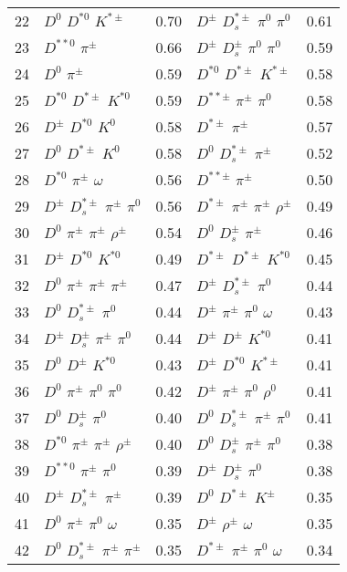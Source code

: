 \documentclass[6pt]{article}
\begin{document}
\begin{tabular}{rlr|lr}
22 & $D^0$ $D^{*0}$ $K^{*\pm}$ & 0.70 & $D^{\pm}$ $D_s^{*\pm}$ $\pi^0$ $\pi^0$ & 0.61 \\
23 & $D^{**0}$ $\pi^{\pm}$ & 0.66 & $D^{\pm}$ $D_s^{\pm}$ $\pi^0$ $\pi^0$ & 0.59 \\
24 & $D^0$ $\pi^{\pm}$ & 0.59 & $D^{*0}$ $D^{*\pm}$ $K^{*\pm}$ & 0.58 \\
25 & $D^{*0}$ $D^{*\pm}$ $K^{*0}$ & 0.59 & $D^{**\pm}$ $\pi^{\pm}$ $\pi^0$ & 0.58 \\
26 & $D^{\pm}$ $D^{*0}$ $K^0$ & 0.58 & $D^{*\pm}$ $\pi^{\pm}$ & 0.57 \\
27 & $D^0$ $D^{*\pm}$ $K^0$ & 0.58 & $D^0$ $D_s^{*\pm}$ $\pi^{\pm}$ & 0.52 \\
28 & $D^{*0}$ $\pi^{\pm}$ $\omega$ & 0.56 & $D^{**\pm}$ $\pi^{\pm}$ & 0.50 \\
29 & $D^{\pm}$ $D_s^{*\pm}$ $\pi^{\pm}$ $\pi^0$ & 0.56 & $D^{*\pm}$ $\pi^{\pm}$ $\pi^{\pm}$ $\rho^{\pm}$ & 0.49 \\
30 & $D^0$ $\pi^{\pm}$ $\pi^{\pm}$ $\rho^{\pm}$ & 0.54 & $D^0$ $D_s^{\pm}$ $\pi^{\pm}$ & 0.46 \\
31 & $D^{\pm}$ $D^{*0}$ $K^{*0}$ & 0.49 & $D^{*\pm}$ $D^{*\pm}$ $K^{*0}$ & 0.45 \\
32 & $D^0$ $\pi^{\pm}$ $\pi^{\pm}$ $\pi^{\pm}$ & 0.47 & $D^{\pm}$ $D_s^{*\pm}$ $\pi^0$ & 0.44 \\
33 & $D^0$ $D_s^{*\pm}$ $\pi^0$ & 0.44 & $D^{\pm}$ $\pi^{\pm}$ $\pi^0$ $\omega$ & 0.43 \\
34 & $D^{\pm}$ $D_s^{\pm}$ $\pi^{\pm}$ $\pi^0$ & 0.44 & $D^{\pm}$ $D^{\pm}$ $K^{*0}$ & 0.41 \\
35 & $D^0$ $D^{\pm}$ $K^{*0}$ & 0.43 & $D^{\pm}$ $D^{*0}$ $K^{*\pm}$ & 0.41 \\
36 & $D^0$ $\pi^{\pm}$ $\pi^0$ $\pi^0$ & 0.42 & $D^{\pm}$ $\pi^{\pm}$ $\pi^0$ $\rho^0$ & 0.41 \\
37 & $D^0$ $D_s^{\pm}$ $\pi^0$ & 0.40 & $D^0$ $D_s^{*\pm}$ $\pi^{\pm}$ $\pi^0$ & 0.41 \\
38 & $D^{*0}$ $\pi^{\pm}$ $\pi^{\pm}$ $\rho^{\pm}$ & 0.40 & $D^0$ $D_s^{\pm}$ $\pi^{\pm}$ $\pi^0$ & 0.38 \\
39 & $D^{**0}$ $\pi^{\pm}$ $\pi^0$ & 0.39 & $D^{\pm}$ $D_s^{\pm}$ $\pi^0$ & 0.38 \\
40 & $D^{\pm}$ $D_s^{*\pm}$ $\pi^{\pm}$ & 0.39 & $D^0$ $D^{*\pm}$ $K^{\pm}$ & 0.35 \\
41 & $D^0$ $\pi^{\pm}$ $\pi^0$ $\omega$ & 0.35 & $D^{\pm}$ $\rho^{\pm}$ $\omega$ & 0.35 \\
42 & $D^0$ $D_s^{*\pm}$ $\pi^{\pm}$ $\pi^{\pm}$ & 0.35 & $D^{*\pm}$ $\pi^{\pm}$ $\pi^0$ $\omega$ & 0.34 \\

\end{tabular}
\end{document}
